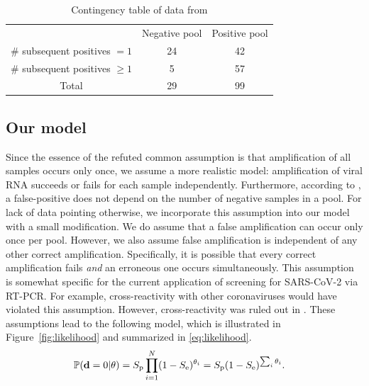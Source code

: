 \documentclass{article}
\begin{document}
\begin{table}[h]
\centering
\begin{tabular}{ c c c }
                                & Negative pool  & Positive pool \\%
\# subsequent positives $=1$    & 24             & 42            \\%
\# subsequent positives $\geq1$ & 5              & 57            \\%
 Total                          & 29             & 99            \\%
\end{tabular}
\caption{Contingency table of data from \cite{Salazar}}\label{table}
\end{table}

\subsection*{Our model}\label{subsec:ours}
Since the essence of the refuted common assumption is that
amplification of all samples occurs only once, we assume a more realistic model:
amplification of viral RNA succeeds or fails for each sample
independently. Furthermore, according to \cite{Simplistic1,
  Simplistic2, Kim, OptimalDorfmanPool}, a false-positive does not
depend on the number of negative samples in a pool. For lack of data pointing otherwise, we incorporate this assumption into our model
with a small modification. We do assume that a false amplification can occur only once per pool. However, we also assume
false amplification is independent of any other correct amplification. Specifically, it is possible that every
correct amplification fails \emph{and} an erroneous one occurs
simultaneously. This assumption is somewhat specific for the current
application of screening for SARS-CoV-2 via RT-PCR. For example,
cross-reactivity with other coronaviruses would have violated this
assumption. However, cross-reactivity was ruled out in
\cite{KitComparison}. These assumptions lead to the following  model, which is
illustrated in Figure~\ref{fig:likelihood} and summarized in
\eqref{eq:likelihood}.
\begin{align}\label{eq:likelihood}
    \mathbb{P}(\mathbf{d}=0 | \theta) &= S_{\text{p}}\prod_{i=1}^N (1-S_{\text{e}})^{\theta_i} =
    S_{\text{p}}(1-S_\text{e})^{\sum_i\theta_i}.
\end{align}
\end{document}
